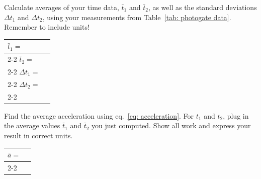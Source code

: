 \documentclass[addpoints]{physlabs}
\begin{document}
\begin{postlab}


    
    \filbreak
    \question[1] Calculate averages of your time data, $\bar{t}_1$ and $\bar{t}_2$, as well as the standard deviations $\Delta t_1$ and $\Delta t_2$, using your measurements from Table~\ref{tab: photogate data}. Remember to include units!

    {\renewcommand{\arraystretch}{2.2}
    \begin{tabular}{lp{3cm}}
        $\bar{t}_1=$  &  \\
        \cline{2-2}
        $\bar{t}_2=$  &  \\
        \cline{2-2}
        $\Delta t_1=$ &  \\
        \cline{2-2}
        $\Delta t_2=$ &  \\
        \cline{2-2}
    \end{tabular}}
    
    \begin{solution}[1cm]
        
    \end{solution}

    \filbreak
    \question[1] Find the average acceleration using eq.~\ref{eq: acceleration}. For $t_1$ and $t_2$, plug in the average values $\bar{t}_1$ and $\bar{t}_2$ you just computed. Show all work and express your result in correct units.

    {\renewcommand{\arraystretch}{2.2}
    \begin{tabular}{lp{3cm}}
        $\bar{a}=$  &  \\
        \cline{2-2}
    \end{tabular}}

    \begin{solution}[1cm]
        
    \end{solution}

    \filbreak
    \question
\end{postlab}
\end{document}
